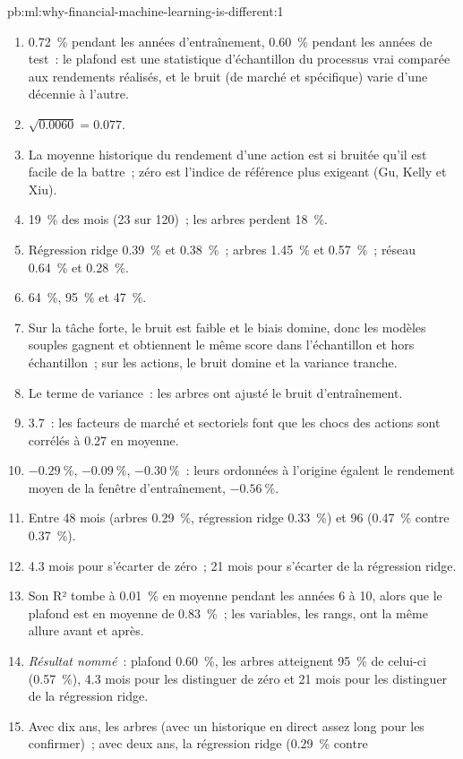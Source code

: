 \begin{solution}{pb:ml:why-financial-machine-learning-is-different:1}
\begin{enumerate}
\item 0.72~\% pendant les années d'entraînement, 0.60~\% pendant les années de test~: le plafond est une statistique d'échantillon du processus vrai comparée
aux rendements réalisés, et le bruit (de marché et spécifique) varie d'une décennie à l'autre.
\item $\sqrt{0.0060} = 0.077$.
\item La moyenne historique du rendement d'une action est si bruitée qu'il est facile de la battre~; zéro est l'indice de référence plus exigeant (Gu,
Kelly et Xiu).
\item 19~\% des mois (23 sur 120)~; les arbres perdent 18~\%.
\item Régression ridge 0.39~\% et 0.38~\%~; arbres 1.45~\% et 0.57~\%~; réseau 0.64~\% et 0.28~\%.
\item 64~\%, 95~\% et 47~\%.
\item Sur la tâche forte, le bruit est faible et le biais domine, donc les modèles souples gagnent et obtiennent le même score dans
l'échantillon et hors échantillon~; sur les actions, le bruit domine et la variance tranche.
\item Le terme de variance~: les arbres ont ajusté le bruit d'entraînement.
\item 3.7~: les facteurs de marché et sectoriels font que les chocs des actions sont corrélés à 0.27 en moyenne.
\item $-0.29~\%$, $-0.09~\%$, $-0.30~\%$~: leurs ordonnées à l'origine égalent le rendement moyen de la fenêtre d'entraînement, $-0.56~\%$.
\item Entre 48 mois (arbres 0.29~\%, régression ridge 0.33~\%) et 96 (0.47~\% contre 0.37~\%).
\item 4.3 mois pour s'écarter de zéro~; 21 mois pour s'écarter de la régression ridge.
\item Son R² tombe à 0.01~\% en moyenne pendant les années 6 à 10, alors que le plafond est en moyenne de 0.83~\%~; les variables, les rangs,
ont la même allure avant et après.
\item \emph{Résultat nommé}~: plafond 0.60~\%, les arbres atteignent 95~\% de celui-ci (0.57~\%), 4.3 mois pour les distinguer de zéro et 21
mois pour les distinguer de la régression ridge.
\item Avec dix ans, les arbres (avec un historique en direct assez long pour les confirmer)~; avec deux ans, la régression ridge (0.29~\% contre

\end{enumerate}
\end{solution}
